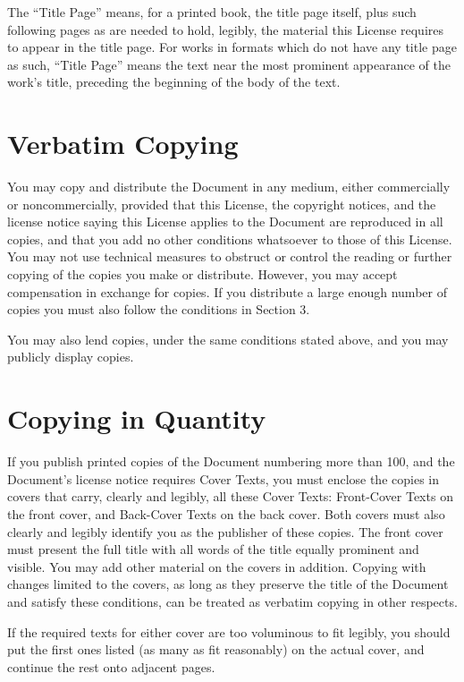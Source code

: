 The ``Title Page'' means, for a printed book, the title page itself,
plus such following pages as are needed to hold, legibly, the material
this License requires to appear in the title page. For works in formats
which do not have any title page as such, ``Title Page'' means the
text near the most prominent appearance of the work's title, preceding
the beginning of the body of the text.

\section{Verbatim Copying}

You may copy and distribute the Document in any medium, either commercially
or noncommercially, provided that this License, the copyright notices,
and the license notice saying this License applies to the Document
are reproduced in all copies, and that you add no other conditions
whatsoever to those of this License. You may not use technical measures
to obstruct or control the reading or further copying of the copies
you make or distribute. However, you may accept compensation in exchange
for copies. If you distribute a large enough number of copies you
must also follow the conditions in Section 3.

You may also lend copies, under the same conditions stated above,
and you may publicly display copies.

\section{Copying in Quantity}

If you publish printed copies of the Document numbering more than
100, and the Document's license notice requires Cover Texts, you must
enclose the copies in covers that carry, clearly and legibly, all
these Cover Texts: Front-Cover Texts on the front cover, and Back-Cover
Texts on the back cover. Both covers must also clearly and legibly
identify you as the publisher of these copies. The front cover must
present the full title with all words of the title equally prominent
and visible. You may add other material on the covers in addition.
Copying with changes limited to the covers, as long as they preserve
the title of the Document and satisfy these conditions, can be treated
as verbatim copying in other respects.

If the required texts for either cover are too voluminous to fit legibly,
you should put the first ones listed (as many as fit reasonably) on
the actual cover, and continue the rest onto adjacent pages.

